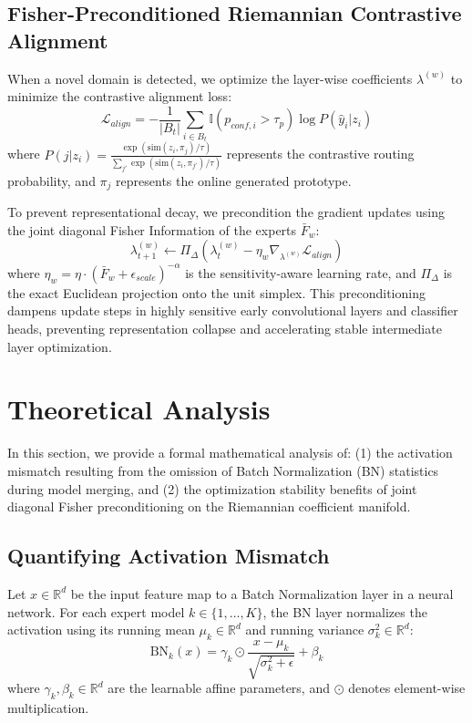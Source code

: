 \documentclass{article}
\begin{document}
\subsection{Fisher-Preconditioned Riemannian Contrastive Alignment}
When a novel domain is detected, we optimize the layer-wise coefficients $\lambda^{(w)}$ to minimize the contrastive alignment loss:
\begin{equation}
\mathcal{L}_{align} = - \frac{1}{|B_t|} \sum_{i \in B_t} \mathbb{I}(p_{conf, i} > \tau_p) \log P(\hat{y}_i | z_i)
\end{equation}
where $P(j|z_i) = \frac{\exp(\text{sim}(z_i, \pi_j)/\tau)}{\sum_{j'} \exp(\text{sim}(z_i, \pi_{j'})/\tau)}$ represents the contrastive routing probability, and $\pi_j$ represents the online generated prototype.

To prevent representational decay, we precondition the gradient updates using the joint diagonal Fisher Information of the experts $\bar{F}_w$:
\begin{equation}
\lambda^{(w)}_{t+1} \leftarrow \Pi_{\Delta} \left( \lambda^{(w)}_t - \eta_w \nabla_{\lambda^{(w)}} \mathcal{L}_{align} \right)
\end{equation}
where $\eta_w = \eta \cdot (\bar{F}_w + \epsilon_{scale})^{-\alpha}$ is the sensitivity-aware learning rate, and $\Pi_{\Delta}$ is the exact Euclidean projection onto the unit simplex. This preconditioning dampens update steps in highly sensitive early convolutional layers and classifier heads, preventing representation collapse and accelerating stable intermediate layer optimization.

\section{Theoretical Analysis}
\label{sec:theory}

In this section, we provide a formal mathematical analysis of: (1) the activation mismatch resulting from the omission of Batch Normalization (BN) statistics during model merging, and (2) the optimization stability benefits of joint diagonal Fisher preconditioning on the Riemannian coefficient manifold.

\subsection{Quantifying Activation Mismatch}
Let $x \in \mathbb{R}^d$ be the input feature map to a Batch Normalization layer in a neural network. For each expert model $k \in \{1, \dots, K\}$, the BN layer normalizes the activation using its running mean $\mu_k \in \mathbb{R}^d$ and running variance $\sigma_k^2 \in \mathbb{R}^d$:
\begin{equation}
\text{BN}_k(x) = \gamma_k \odot \frac{x - \mu_k}{\sqrt{\sigma_k^2 + \epsilon}} + \beta_k
\end{equation}
where $\gamma_k, \beta_k \in \mathbb{R}^d$ are the learnable affine parameters, and $\odot$ denotes element-wise multiplication. 
\end{document}
